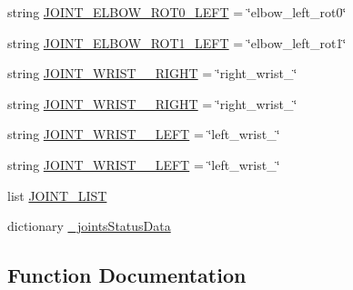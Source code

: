\begin{DoxyCompactItemize}
\item 
string \mbox{\hyperlink{namespacesteering__capture__trajectory_ae81c3789f89ac25aece9065e812a0de1}{J\+O\+I\+N\+T\+\_\+\+E\+L\+B\+O\+W\+\_\+\+R\+O\+T0\+\_\+\+L\+E\+FT}} = \char`\"{}elbow\+\_\+left\+\_\+rot0\char`\"{}
\item 
string \mbox{\hyperlink{namespacesteering__capture__trajectory_a08db59483dbf4b9cb7a471e47ff83c41}{J\+O\+I\+N\+T\+\_\+\+E\+L\+B\+O\+W\+\_\+\+R\+O\+T1\+\_\+\+L\+E\+FT}} = \char`\"{}elbow\+\_\+left\+\_\+rot1\char`\"{}
\item 
string \mbox{\hyperlink{namespacesteering__capture__trajectory_a383cd035a5617d903cae0ef48987d360}{J\+O\+I\+N\+T\+\_\+\+W\+R\+I\+S\+T\+\_\+\_\+\+R\+I\+G\+HT}} = \char`\"{}right\+\_\+wrist\+\_\char`\"{}
\item 
string \mbox{\hyperlink{namespacesteering__capture__trajectory_ad8f88e0b045eccafc6620ad8af1dc98d}{J\+O\+I\+N\+T\+\_\+\+W\+R\+I\+S\+T\+\_\+\_\+\+R\+I\+G\+HT}} = \char`\"{}right\+\_\+wrist\+\_\char`\"{}
\item 
string \mbox{\hyperlink{namespacesteering__capture__trajectory_a58d4b644a3b5fa765a5e2279e154dae8}{J\+O\+I\+N\+T\+\_\+\+W\+R\+I\+S\+T\+\_\+\_\+\+L\+E\+FT}} = \char`\"{}left\+\_\+wrist\+\_\char`\"{}
\item 
string \mbox{\hyperlink{namespacesteering__capture__trajectory_a1e467cec7cc284d8374bbc1283979f0e}{J\+O\+I\+N\+T\+\_\+\+W\+R\+I\+S\+T\+\_\+\_\+\+L\+E\+FT}} = \char`\"{}left\+\_\+wrist\+\_\char`\"{}
\item 
list \mbox{\hyperlink{namespacesteering__capture__trajectory_a47cf8ad04585bce499c0aa968eb557cd}{J\+O\+I\+N\+T\+\_\+\+L\+I\+ST}}
\item 
dictionary \mbox{\hyperlink{namespacesteering__capture__trajectory_ad68c893888704e099cb94188b4859ac4}{\+\_\+joints\+Status\+Data}}
\end{DoxyCompactItemize}


\subsection{Function Documentation}
\mbox{\label{namespacesteering__capture__trajectory_a5c680d4059a6f6632b82e3f8faf773b7}} 
